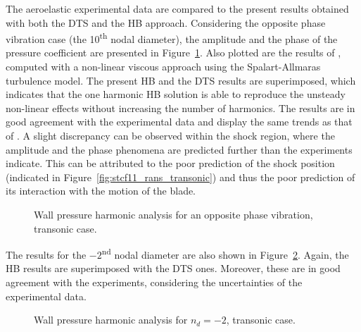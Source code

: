 The aeroelastic experimental data are compared to the present results
obtained with both the DTS and the HB approach.  
Considering the opposite phase vibration case (the 10\textsuperscript{th} nodal diameter), 
the amplitude and the
phase of the pressure coefficient are presented in
Figure~\ref{fig:stcf11_ael_transonic_ibpa_180_paper}. Also plotted are the results of
\citet{Cinnella2004}, computed with a non-linear viscous
approach using the Spalart-Allmaras turbulence model. The present HB and the DTS
results are superimposed, which indicates that the one harmonic HB solution is able
to reproduce the unsteady non-linear effects without increasing the
number of harmonics. The results are in good agreement with
the experimental data and display the same trends as that of
\citet{Cinnella2004}. A slight discrepancy can be observed within the shock
region, where the amplitude and the phase phenomena are predicted
further than the experiments indicate.  This can be attributed to the poor
prediction of the shock position (indicated in 
Figure~\ref{fig:stcf11_rans_transonic}) and thus the poor prediction
of its interaction with the motion of the blade.
\begin{figure}[htp]
  \centering
  \caption{Wall pressure harmonic analysis for an opposite phase vibration, transonic case.}
  \label{fig:stcf11_ael_transonic_ibpa_180_paper}
\end{figure}

The results for the $-2$\textsuperscript{nd} nodal diameter are also shown in
Figure~\ref{fig:stcf11_ael_transonic_ibpa_324_paper}. Again,
the HB results are superimposed with the DTS ones. Moreover, these are in
good agreement with the experiments, considering the uncertainties of
the experimental data.
\begin{figure}[htp]
  \centering
  \caption{Wall pressure harmonic analysis for \mbox{$n_d=-2$}, transonic case.}
  \label{fig:stcf11_ael_transonic_ibpa_324_paper}
\end{figure}

